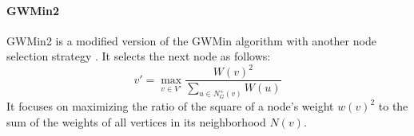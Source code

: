 \paragraph{GWMin2}
GWMin2 is a modified version of the GWMin algorithm with another node selection strategy \cite{SAKAI2003313}.
It selects the next node as follows:
\[
    v' = \max_{v \in V'} \frac{W(v)^2}{\sum_{u \in N_G^+(v)} W(u)}
\]
It focuses
on maximizing the ratio of the square of a node's weight $w\left(v\right)^2$ to the sum of the weights of all vertices in its neighborhood $N\left(v\right)$.


